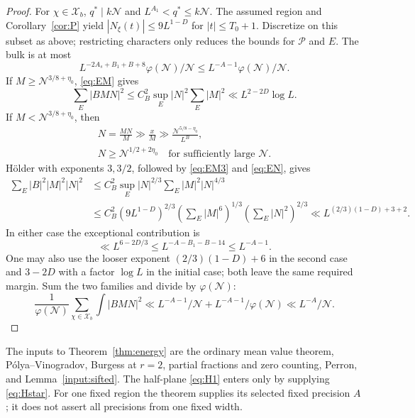 \documentclass[11pt]{article}
\theoremstyle{definition}
\newcommand{\ph}{\varphi}
\newcommand{\GN}{\mathcal N}
\theoremstyle{remark}
\numberwithin{equation}{section}
\begin{document}
\begin{proof}
For $\chi\in\mathcal X_b$,
$q^*\mid k\GN$ and $L^{A_1}<q^*\le k\GN$.
The assumed region and Corollary~\ref{cor:P} yield
$|N_\xi(t)|\le9L^{1-D}$ for $|t|\le T_0+1$.
Discretize on this subset as above; restricting characters only
reduces the bounds for $\mathcal P$ and $E$.
The bulk is at most
\[
 L^{-2A_s+B_1+B+8}\ph(\GN)/\GN
 \le L^{-A-1}\ph(\GN)/\GN.
\]
If $M\ge\GN^{3/8+\eta_0}$, \eqref{eq:EM} gives
\begin{equation}\label{eq:caseA}
 \sum_E|BMN|^2
 \le C_B^2\sup_E|N|^2\sum_E|M|^2
 \ll L^{2-2D}\log L.
\end{equation}
If $M<\GN^{3/8+\eta_0}$, then
\begin{equation}\label{eq:caseB-length}
 \begin{gathered}
 N=\frac{MN}{M}\gg\frac{x}{M}
       \gg\frac{\GN^{5/8-\eta_0}}{L^B},\\
 N\ge\GN^{1/2+2\eta_0}\quad\text{for sufficiently large }\GN.
 \end{gathered}
\end{equation}
H\"older with exponents $3,3/2$, followed by
\eqref{eq:EM3} and \eqref{eq:EN}, gives
\begin{equation}\label{eq:caseB}
 \begin{split}
 \sum_E|B|^2|M|^2|N|^2
 &\le C_B^2\sup_E|N|^{2/3}\sum_E|M|^2|N|^{4/3}\\
 &\le C_B^2(9L^{1-D})^{2/3}
       (\sum_E|M|^6)^{1/3}(\sum_E|N|^2)^{2/3}
 \ll L^{(2/3)(1-D)+3+2}.
 \end{split}
\end{equation}
In either case the exceptional contribution is
\begin{equation}\label{eq:exceptional-end}
 \ll L^{6-2D/3}\le L^{-A-B_1-B-14}\le L^{-A-1}.
\end{equation}
One may also use the looser exponent
$(2/3)(1-D)+6$ in the second case and
$3-2D$ with a factor $\log L$ in the initial case; both leave the
same required margin. Sum the two families and divide by $\ph(\GN)$:
\[
 \frac1{\ph(\GN)}\sum_{\chi\in\mathcal X_b}\int|BMN|^2
 \ll L^{-A-1}/\GN+L^{-A-1}/\ph(\GN)\ll L^{-A}/\GN.
\]
\end{proof}
The inputs to Theorem~\ref{thm:energy} are the ordinary mean value theorem,
P\'olya--Vinogradov, Burgess at $r=2$, partial fractions and zero
counting, Perron, and Lemma~\ref{input:sifted}. The half-plane
\eqref{eq:H1} enters only by supplying \eqref{eq:Hstar}.
For one fixed region the theorem supplies its selected fixed
precision $A$; it does not assert all precisions from one fixed width.
\end{document}
